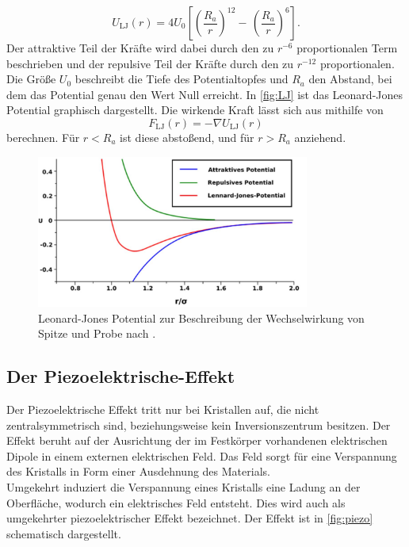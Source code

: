 \begin{equation}
  U_{\text{LJ}}(r) = 4U_0\left[\left(\frac{R_a}{r}\right)^{12}-\,\left(\frac{R_a}{r}\right)^6\right].
\end{equation}
Der attraktive Teil der Kräfte wird dabei durch den zu $r^{-6}$ proportionalen Term beschrieben und der repulsive Teil der Kräfte durch den zu $r^{-12}$ proportionalen.
Die Größe $U_0$ beschreibt die Tiefe des Potentialtopfes und $R_a$ den Abstand, bei dem das Potential genau den Wert Null erreicht. In \autoref{fig:LJ} ist das Leonard-Jones Potential graphisch dargestellt.
Die wirkende Kraft lässt sich aus mithilfe von
\begin{equation}
  F_{\text{LJ}}(r) = - \nabla U_{\text{LJ}}(r)
\end{equation}
berechnen. Für $r<R_a$ ist diese abstoßend, und für $r>R_a$ anziehend.
\begin{figure}[H]
  \centering
  \includegraphics[width=0.8\textwidth]{content/plots/LJ.jpg}
  \caption{Leonard-Jones Potential zur Beschreibung der Wechselwirkung von Spitze und Probe nach \cite{Voigt}.}
  \label{fig:LJ}
\end{figure}
\subsection{Der Piezoelektrische-Effekt}
Der Piezoelektrische Effekt tritt nur bei Kristallen auf, die nicht zentralsymmetrisch sind, beziehungsweise kein Inversionszentrum besitzen. Der Effekt beruht auf der Ausrichtung der im Festkörper vorhandenen elektrischen Dipole in einem externen elektrischen Feld. Das Feld sorgt für eine Verspannung des Kristalls in Form einer Ausdehnung des Materials.\\
Umgekehrt induziert die Verspannung eines Kristalls eine Ladung an der Oberfläche, wodurch ein elektrisches Feld entsteht. Dies wird auch als umgekehrter piezoelektrischer Effekt bezeichnet. Der Effekt ist in \autoref{fig:piezo} schematisch dargestellt.

